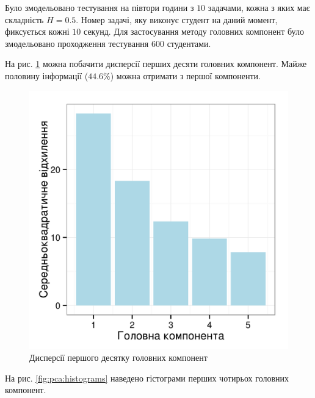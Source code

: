 Було змодельовано тестування на півтори години з $10$ задачами,
кожна з яких має складність $H=0.5$.
Номер задачі, яку виконує студент на даний момент, фиксується кожні $10$
секунд.
Для застосування методу головних компонент
було змодельовано проходження тестування $600$ студентами.

На рис. \ref{fig:pca:main} можна побачити дисперсії перших десяти головних
компонент.
Майже половину інформації ($44.6\%$) можна отримати з першої компоненти.
\begin{figure}[h]
  \centering
    \includegraphics{images/pca}
  \caption{Дисперсії першого десятку головних компонент}
  \label{fig:pca:main}
\end{figure}
На рис. \ref{fig:pca:histograms} наведено гістограми перших чотирьох
головних компонент.
